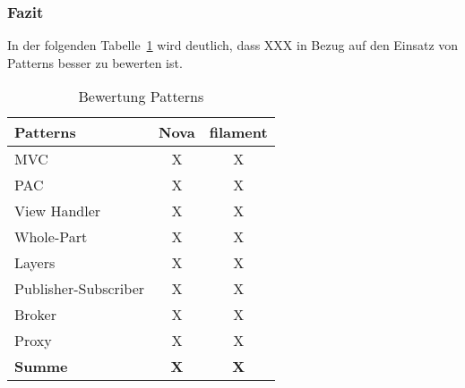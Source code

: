 \subsubsection{Fazit}
In der folgenden Tabelle~\ref{tab:bewertung-patterns} wird deutlich, dass XXX in Bezug auf den Einsatz von Patterns besser zu bewerten ist.

\begin{table}[]
    \caption{Bewertung Patterns}
    \label{tab:bewertung-patterns}
    \centering
    \begin{tabular}{|l|c|c|}
        \hline
        \textbf{Patterns}    & \textbf{Nova} & \textbf{filament} \\ \hline
        MVC                  & X             & X                 \\ \hline
        PAC                  & X             & X                 \\ \hline
        View Handler         & X             & X                 \\ \hline
        Whole-Part           & X             & X                 \\ \hline
        Layers               & X             & X                 \\ \hline
        Publisher-Subscriber & X             & X                 \\ \hline
        Broker               & X             & X                 \\ \hline
        Proxy                & X             & X                 \\ \hline
        \textbf{Summe}       & \textbf{X}    & \textbf{X}        \\ \hline
    \end{tabular}
\end{table}

\color{black}
